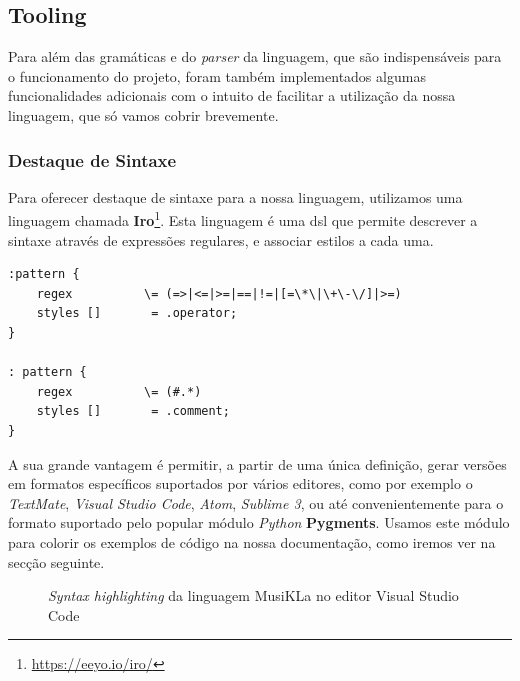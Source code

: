 \subsection{Tooling}
Para além das gramáticas e do \textit{parser} da linguagem, que são indispensáveis para o funcionamento do projeto, foram também implementados algumas funcionalidades adicionais com o intuito de facilitar a utilização da nossa linguagem, que só vamos cobrir brevemente.

\subsubsection{Destaque de Sintaxe}
Para oferecer destaque de sintaxe para a nossa linguagem, utilizamos uma linguagem chamada \textbf{Iro}\footnote{\url{https://eeyo.io/iro/}}. Esta linguagem é uma \acrshort{dsl} que permite descrever a sintaxe através de expressões regulares, e associar estilos a cada uma. 

\begin{lstlisting}[caption={Pequeno excerto da definição da linguagem escrito em Iro}]
:pattern {
    regex          \= (=>|<=|>=|==|!=|[=\*\|\+\-\/]|>=)
    styles []       = .operator;
}

: pattern {
    regex          \= (#.*)
    styles []       = .comment;
}
\end{lstlisting}

A sua grande vantagem é permitir, a partir de uma única definição, gerar versões em formatos específicos suportados por vários editores, como por exemplo o \textit{TextMate}, \textit{Visual Studio Code}, \textit{Atom}, \textit{Sublime 3}, ou até convenientemente para o formato suportado pelo popular módulo \textit{Python} \textbf{Pygments}. Usamos este módulo para colorir os exemplos de código na nossa documentação, como iremos ver na secção seguinte.


\begin{figure}[ht]
  \centering
  {%
  \setlength{\fboxsep}{0pt}%
  \setlength{\fboxrule}{0pt}%
  }%
  \caption{\textit{Syntax highlighting} da linguagem MusiKLa no editor Visual Studio Code}
  \label{fig:syntax-highlighting-code}
\end{figure}

